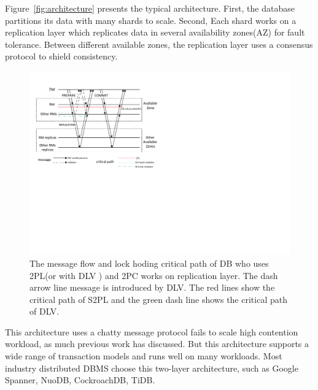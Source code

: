 \documentclass[conference]{IEEEtran}
\begin{document}
Figure~\ref{fig:architecture} presents the typical architecture.
First, the database partitions its data with many shards to scale.
Second, Each shard works on a replication layer which replicates data in several availability zones(AZ)\cite{Aurora:conf/sigmod/VerbitskiGSCGBM18} for fault tolerance.
Between different available zones, the replication layer uses a consensus protocol to shield consistency.
\begin{figure}[htbp]
  \centerline{\includegraphics[scale=0.62]{figure/message_flow.pdf}}
  \caption{The message flow and lock hoding critical path of DB who uses 2PL(or with DLV ) and 2PC works on replication layer. 
The dash arrow line message is introduced by DLV. The red lines show the critical path of S2PL and the green dash line shows the critical path of DLV.}
  \label{fig:two_layers_architecture}
\end{figure}
This architecture uses a chatty message protocol fails to scale high contention workload, as much previous work has discussed\cite{Calvin:conf/sigmod/ThomsonDWRSA12}\cite{Tapir:conf/sosp/ZhangSSKP15}\cite{Janus:conf/osdi/MuNLL16}.
But this architecture supports a wide range of transaction models and runs well on many workloads.
Most industry distributed DBMS choose this two-layer architecture, such as Google Spanner\cite{Spanner:conf/osdi/CorbettDEFFFGGHHHKKLLMMNQRRSSTWW12}\cite{Spanner:conf/sigmod/BaconBBCDFFGJKL17}, NuoDB\cite{NuoDB}, CockroachDB\cite{CockroachDB}, TiDB\cite{TiDB}.
\end{document}

